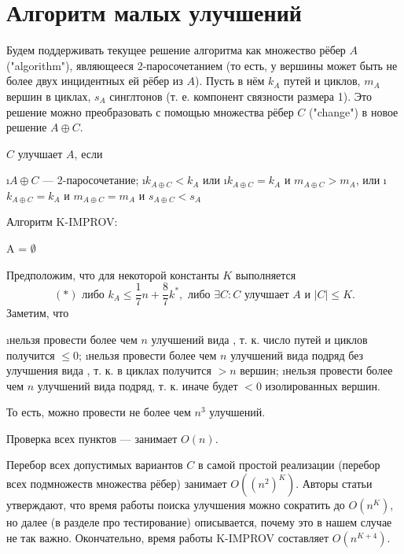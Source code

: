 \section{Алгоритм малых улучшений}
Будем поддерживать текущее решение алгоритма как множество рёбер $A$ ("algorithm"), являющееся 2-паросочетанием (то есть, у вершины может быть не более двух инцидентных ей рёбер из $A$). Пусть в нём $k_A$ путей и циклов, $m_A$ вершин в циклах, $s_A$ синглтонов (т. е. компонент связности размера 1). Это решение можно преобразовать с помощью множества рёбер $C$ ("change") в новое решение $A \oplus C$. 

$C$ улучшает $A$, если 
\begin{enumerate}[label=\protect\circled{{\arabic*}}]
	\i $A \oplus C$ --- 2-паросочетание;
	\i $k_{A \oplus C} < k_A$ или
	\i $k_{A \oplus C} = k_A$ и $m_{A \oplus C} > m_A$, или
	\i $k_{A \oplus C} = k_A$ и $m_{A \oplus C} = m_A$ и $s_{A \oplus C} < s_A$
\end{enumerate}

Алгоритм K-IMPROV:

\begin{algorithm}[H]
 A = $\emptyset$\;
\end{algorithm}

Предположим, что для некоторой константы $K$ выполняется 
$$(*) \text{ либо } k_A \le \frac{1}{7}n+\frac{8}{7}k^*, \text{ либо } \exists C: C \text{ улучшает } A \textbf{ и } |C|\le K.$$
Заметим, что
\begin{itemize}
 \i нельзя провести более чем $n$ улучшений вида , т. к. число путей и циклов получится $\le 0$;
 \i нельзя провести более чем $n$ улучшений вида  подряд без улучшения вида , т. к. в циклах получится $>n$ вершин;
 \i нельзя провести более чем $n$ улучшений вида  подряд, т. к. иначе будет $< 0$ изолированных вершин. 
\end{itemize}
То есть, можно провести не более чем $n^3$ улучшений.

Проверка всех пунктов  ---  занимает $O(n)$.

Перебор всех допустимых вариантов $C$ в самой простой реализации (перебор всех подмножеств множества рёбер) занимает $O((n^2)^K)$. Авторы статьи утверждают, что время работы поиска улучшения можно сократить до  $O(n^K)$, но далее (в разделе про тестирование) описывается, почему это в нашем случае не так важно. Окончательно, время работы K-IMPROV составляет $O(n^{K+4})$.

